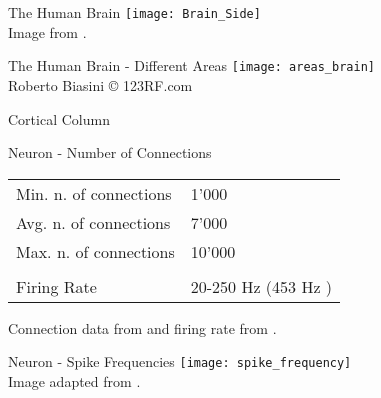 \begin{frame}[c]{The Human Brain}
    \texttt{[image: Brain\_Side]} \\
    \normalsize
    Image from \cite{figsidebrain}.
\end{frame}


\begin{frame}[c]{The Human Brain - Different Areas}
    \texttt{[image: areas\_brain]} \\
    \normalsize
    Roberto Biasini © 123RF.com
\end{frame}


\begin{frame}[c]{Cortical Column}
\end{frame}




\begin{frame}[c]{Neuron - Number of Connections}
    \pause
    \vfill %
    \begin{tabular}{ll}
        Min. n. of connections \phantom{AAA} & 1'000 \\
        Avg. n. of connections & 7'000 \\
        Max. n. of connections & 10'000 \\ \\ \pause
        Firing Rate & 20-250 Hz (453 Hz \cite{wang2016firing}) \\
    \end{tabular}
    \newline
    \vfill
    \small
    Connection data from \cite{herculano2009human} and firing rate from \cite{impact2015firing}.
\end{frame}


\begin{frame}[c]{Neuron - Spike Frequencies}
    \texttt{[image: spike\_frequency]} \\
    \normalsize
    Image adapted from \cite{yi2019average}.
\end{frame}


